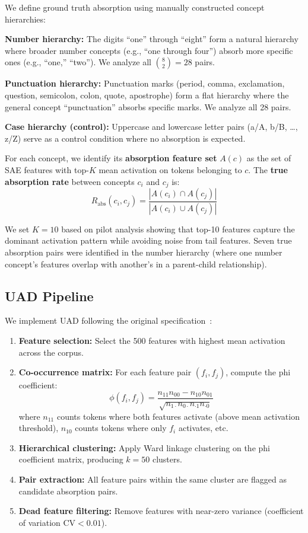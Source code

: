 \documentclass{article}
\begin{document}
We define ground truth absorption using manually constructed concept hierarchies:

\textbf{Number hierarchy:} The digits ``one'' through ``eight'' form a natural hierarchy where broader number concepts (e.g., ``one through four'') absorb more specific ones (e.g., ``one,'' ``two''). We analyze all $\binom{8}{2} = 28$ pairs.

\textbf{Punctuation hierarchy:} Punctuation marks (period, comma, exclamation, question, semicolon, colon, quote, apostrophe) form a flat hierarchy where the general concept ``punctuation'' absorbs specific marks. We analyze all 28 pairs.

\textbf{Case hierarchy (control):} Uppercase and lowercase letter pairs (a/A, b/B, \ldots, z/Z) serve as a control condition where no absorption is expected.

For each concept, we identify its \textbf{absorption feature set} $A(c)$ as the set of SAE features with top-$K$ mean activation on tokens belonging to $c$. The \textbf{true absorption rate} between concepts $c_i$ and $c_j$ is:
\begin{equation}
R_{\text{abs}}(c_i, c_j) = \frac{|A(c_i) \cap A(c_j)|}{|A(c_i) \cup A(c_j)|}
\end{equation}

We set $K = 10$ based on pilot analysis showing that top-10 features capture the dominant activation pattern while avoiding noise from tail features. Seven true absorption pairs were identified in the number hierarchy (where one number concept's features overlap with another's in a parent-child relationship).

\subsection{UAD Pipeline}

We implement UAD following the original specification~\citep{chanin2024absorption}:
\begin{enumerate}
\item \textbf{Feature selection:} Select the 500 features with highest mean activation across the corpus.
\item \textbf{Co-occurrence matrix:} For each feature pair $(f_i, f_j)$, compute the phi coefficient:
\begin{equation}
\phi(f_i, f_j) = \frac{n_{11}n_{00} - n_{10}n_{01}}{\sqrt{n_{1\cdot}n_{0\cdot}n_{\cdot 1}n_{\cdot 0}}}
\end{equation}
where $n_{11}$ counts tokens where both features activate (above mean activation threshold), $n_{10}$ counts tokens where only $f_i$ activates, etc.
\item \textbf{Hierarchical clustering:} Apply Ward linkage clustering on the phi coefficient matrix, producing $k = 50$ clusters.
\item \textbf{Pair extraction:} All feature pairs within the same cluster are flagged as candidate absorption pairs.
\item \textbf{Dead feature filtering:} Remove features with near-zero variance (coefficient of variation $\text{CV} < 0.01$).
\end{enumerate}
\end{document}
